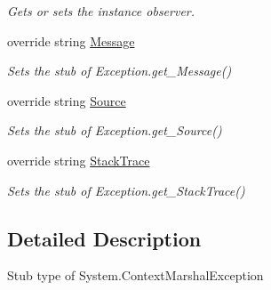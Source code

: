 \begin{DoxyCompactItemize}
\begin{DoxyCompactList}\small\item\em Gets or sets the instance observer.\end{DoxyCompactList}\item 
override string \hyperlink{class_system_1_1_fakes_1_1_stub_context_marshal_exception_a3a4d951c845b38580d11cd182fa0853d}{Message}
\begin{DoxyCompactList}\small\item\em Sets the stub of Exception.\-get\-\_\-\-Message()\end{DoxyCompactList}\item 
override string \hyperlink{class_system_1_1_fakes_1_1_stub_context_marshal_exception_abd7b6c24a73445a0f6d80e73e4c3e059}{Source}
\begin{DoxyCompactList}\small\item\em Sets the stub of Exception.\-get\-\_\-\-Source()\end{DoxyCompactList}\item 
override string \hyperlink{class_system_1_1_fakes_1_1_stub_context_marshal_exception_a22cad0104c12a9f43f46a8389f8ed05d}{Stack\-Trace}
\begin{DoxyCompactList}\small\item\em Sets the stub of Exception.\-get\-\_\-\-Stack\-Trace()\end{DoxyCompactList}\end{DoxyCompactItemize}


\subsection{Detailed Description}
Stub type of System.\-Context\-Marshal\-Exception



